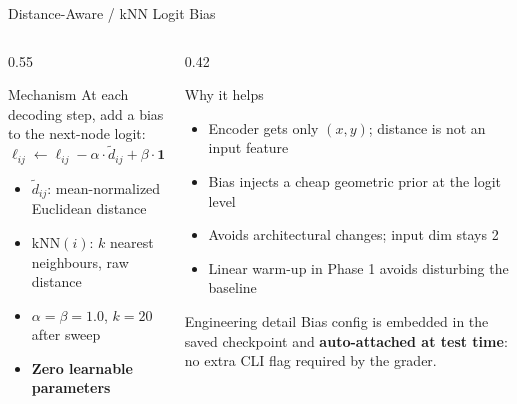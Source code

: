 \documentclass[aspectratio=169,11pt]{beamer}
\newcommand{\tightitems}{%
  \setlength{\itemsep}{1.5pt}%
  \setlength{\parsep}{0pt}%
  \setlength{\topsep}{2pt}%
}
\begin{document}
\begin{frame}[t]{Distance-Aware / kNN Logit Bias}
  \small
  \begin{columns}[T,onlytextwidth]
    \begin{column}{0.55\textwidth}
      \begin{block}{Mechanism}
        At each decoding step, add a bias to the next-node logit:
        \vspace{-0.05cm}
        \[
          \ell_{ij} \leftarrow \ell_{ij}
          - \alpha \cdot \tilde{d}_{ij}
          + \beta \cdot \mathbf{1}\!\left[j \in \mathrm{kNN}(i)\right]
        \]
        \vspace{-0.15cm}
        \begin{itemize}\tightitems
          \item $\tilde{d}_{ij}$: mean-normalized Euclidean distance
          \item $\mathrm{kNN}(i)$: $k$ nearest neighbours, raw distance
          \item $\alpha = \beta = 1.0$, $k = 20$ after sweep
          \item \textbf{Zero learnable parameters}
        \end{itemize}
      \end{block}
    \end{column}
    \hfill
    \begin{column}{0.42\textwidth}
      \begin{block}{Why it helps}
        \begin{itemize}\tightitems
          \item Encoder gets only $(x,y)$; distance is not an input feature
          \item Bias injects a cheap geometric prior at the logit level
          \item Avoids architectural changes; input dim stays 2
          \item Linear warm-up in Phase 1 avoids disturbing the baseline
        \end{itemize}
      \end{block}
      \begin{alertblock}{Engineering detail}
        \scriptsize
        Bias config is embedded in the saved checkpoint and \textbf{auto-attached at test time}: no extra CLI flag required by the grader.
      \end{alertblock}
    \end{column}
  \end{columns}
\end{frame}
\end{document}

